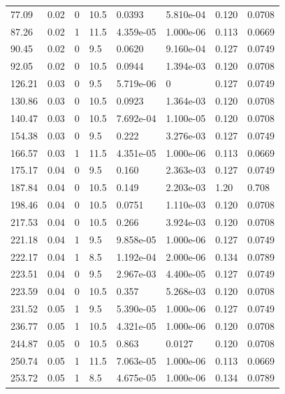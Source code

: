 \documentclass[preview]{standalone}
\begin{document}
{{\begin{tabular}{L{1.2cm}C{1.2cm} C{0.3cm}C{0.5cm} C{1.4cm}C{1.4cm} C{1.4cm}C{1.4cm}}
  77.09  &  0.02  & 0     & 10.5 &  0.0393  & 5.810e-04  & 0.120 &  0.0708   \\ 
  87.26  &  0.02  & 1     & 11.5 &  4.359e-05  & 1.000e-06  & 0.113 &  0.0669   \\ 
  90.45  &  0.02  & 0     & 9.5 &  0.0620  & 9.160e-04  & 0.127 &  0.0749   \\ 
  92.05  &  0.02  & 0     & 10.5 &  0.0944  & 1.394e-03  & 0.120 &  0.0708   \\ 
  126.21  &  0.03  & 0     & 9.5 &  5.719e-06  & 0  & 0.127 &  0.0749   \\ 
  130.86  &  0.03  & 0     & 10.5 &  0.0923  & 1.364e-03  & 0.120 &  0.0708   \\ 
  140.47  &  0.03  & 0     & 10.5 &  7.692e-04  & 1.100e-05  & 0.120 &  0.0708   \\ 
  154.38  &  0.03  & 0     & 9.5 &  0.222  & 3.276e-03  & 0.127 &  0.0749   \\ 
  166.57  &  0.03  & 1     & 11.5 &  4.351e-05  & 1.000e-06  & 0.113 &  0.0669   \\ 
  175.17  &  0.04  & 0     & 9.5 &  0.160  & 2.363e-03  & 0.127 &  0.0749   \\ 
  187.84  &  0.04  & 0     & 10.5 &  0.149  & 2.203e-03  & 1.20 &  0.708   \\ 
  198.46  &  0.04  & 0     & 10.5 &  0.0751  & 1.110e-03  & 0.120 &  0.0708   \\ 
  217.53  &  0.04  & 0     & 10.5 &  0.266  & 3.924e-03  & 0.120 &  0.0708   \\ 
  221.18  &  0.04  & 1     & 9.5 &  9.858e-05  & 1.000e-06  & 0.127 &  0.0749   \\ 
  222.17  &  0.04  & 1     & 8.5 &  1.192e-04  & 2.000e-06  & 0.134 &  0.0789   \\ 
  223.51  &  0.04  & 0     & 9.5 &  2.967e-03  & 4.400e-05  & 0.127 &  0.0749   \\ 
  223.59  &  0.04  & 0     & 10.5 &  0.357  & 5.268e-03  & 0.120 &  0.0708   \\ 
  231.52  &  0.05  & 1     & 9.5 &  5.390e-05  & 1.000e-06  & 0.127 &  0.0749   \\ 
  236.77  &  0.05  & 1     & 10.5 &  4.321e-05  & 1.000e-06  & 0.120 &  0.0708   \\ 
  244.87  &  0.05  & 0     & 10.5 &  0.863  & 0.0127  & 0.120 &  0.0708   \\ 
  250.74  &  0.05  & 1     & 11.5 &  7.063e-05  & 1.000e-06  & 0.113 &  0.0669   \\ 
  253.72  &  0.05  & 1     & 8.5 &  4.675e-05  & 1.000e-06  & 0.134 &  0.0789   \\ 

\end{tabular}}}
\end{document}
